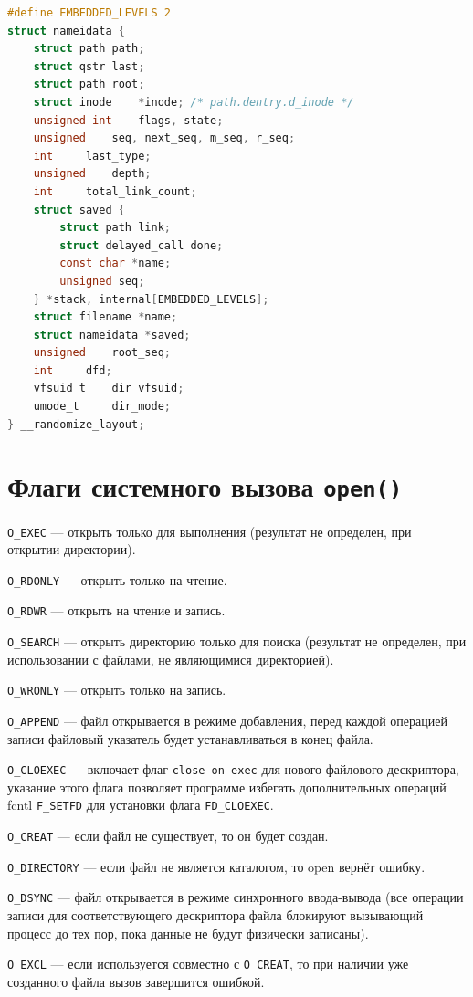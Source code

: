 \documentclass[12pt]{report}
\begin{document}
\begin{lstlisting}[label=first,caption=Структура struct nameidata, language=C]
#define EMBEDDED_LEVELS 2
struct nameidata {
	struct path	path;
	struct qstr	last;
	struct path	root;
	struct inode	*inode; /* path.dentry.d_inode */
	unsigned int	flags, state;
	unsigned	seq, next_seq, m_seq, r_seq;
	int		last_type;
	unsigned	depth;
	int		total_link_count;
	struct saved {
		struct path link;
		struct delayed_call done;
		const char *name;
		unsigned seq;
	} *stack, internal[EMBEDDED_LEVELS];
	struct filename	*name;
	struct nameidata *saved;
	unsigned	root_seq;
	int		dfd;
	vfsuid_t	dir_vfsuid;
	umode_t		dir_mode;
} __randomize_layout;
\end{lstlisting}

\section*{Флаги системного вызова \texttt{open()}}

\texttt{O\_EXEC} --- открыть только для выполнения (результат не определен, при открытии директории).

\texttt{O\_RDONLY} --- открыть только на чтение.

\texttt{O\_RDWR} --- открыть на чтение и запись.

\texttt{O\_SEARCH} --- открыть директорию только для поиска (результат не определен, при использовании с файлами, не являющимися директорией).

\texttt{O\_WRONLY} --- открыть только на запись.

\texttt{O\_APPEND} --- файл открывается в режиме добавления, перед каждой операцией записи файловый указатель будет устанавливаться в конец файла.

\texttt{O\_CLOEXEC} --- включает флаг \texttt{close-on-exec} для нового файлового дескриптора, указание этого флага позволяет программе избегать дополнительных операций fcntl \texttt{F\_SETFD} для установки флага \texttt{FD\_CLOEXEC}.

\texttt{O\_CREAT} --- если файл не существует, то он будет создан.

\texttt{O\_DIRECTORY} --- если файл не является каталогом, то open вернёт ошибку.

\texttt{O\_DSYNC} --- файл открывается в режиме синхронного ввода-вывода (все операции записи для соответствующего дескриптора файла блокируют вызывающий процесс до тех пор, пока данные не будут физически записаны).

\texttt{O\_EXCL} --- если используется совместно с \texttt{O\_CREAT}, то при наличии уже созданного файла вызов завершится ошибкой.
\end{document}
